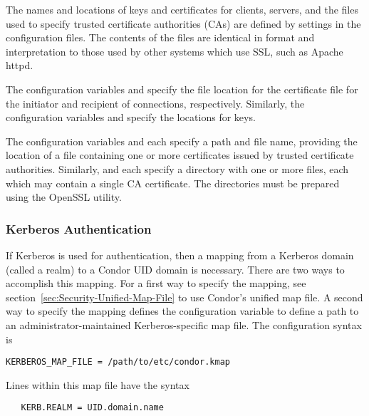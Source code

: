 The names and locations of keys and certificates for clients,
servers, and the files used to specify trusted certificate authorities
(CAs) are defined by settings in the configuration files.
The contents of the files are identical in format
and interpretation to those used by
other systems which use SSL, such as Apache httpd.

The configuration variables 
 and 
specify the file location
for the certificate file for the initiator and recipient of connections,
respectively.
Similarly, the configuration variables
 and 
specify the locations for keys.

The configuration variables 
 and 
each specify a path and file name, providing the location
of a file containing one or more
certificates issued by trusted certificate authorities.
Similarly,
 and 
each specify a directory with one or more files,
each which may contain a single CA certificate.  The directories
must be prepared using the OpenSSL  utility.

\subsubsection{\label{sec:Kerberos-Authentication}Kerberos Authentication}

If Kerberos is used for authentication,
then a mapping from a
Kerberos domain (called a realm) to a Condor UID domain is necessary.
There are two ways to accomplish this mapping.
For a first way to specify the mapping, see
section~\ref{sec:Security-Unified-Map-File}
to use Condor's unified map file.
A second way to specify the mapping defines
the configuration variable
to define a path to an administrator-maintained Kerberos-specific 
map file.
The configuration syntax is
\begin{verbatim}
KERBEROS_MAP_FILE = /path/to/etc/condor.kmap
\end{verbatim}

Lines within this map file have the syntax
\begin{verbatim}
   KERB.REALM = UID.domain.name
\end{verbatim}

